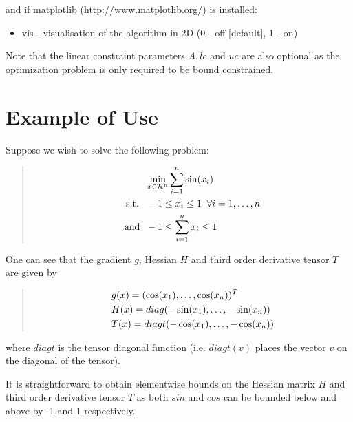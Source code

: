 \documentclass[letterpaper,11pt,openany,oneside]{sphinxmanual}
\begin{document}
and if matplotlib (\href{http://www.matplotlib.org/}{http://www.matplotlib.org/}) is installed:
\begin{itemize}
\item {} 
vis - visualisation of the algorithm in 2D (0 - off {[}default{]}, 1 - on)

\end{itemize}

Note that the linear constraint parameters $A, lc$ and  $uc$ are also optional as the optimization problem is only required to be bound constrained.


\section{Example of Use}
\label{userguide:example-of-use}
Suppose we wish to solve the following problem:
\begin{quote}
\begin{gather}
\begin{split}&\min_{x \in \mathcal{R}^n} \sum_{i=1}^n \sin(x_i) \\
\text{s.t. } \; &-1 \le x_i \le 1 \; \; \forall i=1,\dotsc,n \\
\text{and }  \; &-1 \le \sum_{i=1}^nx_i \le 1\end{split}\notag
\end{gather}\end{quote}

One can see that the gradient $g$, Hessian $H$ and third order derivative tensor $T$ are given by
\begin{quote}
\begin{gather}
\begin{split}&g(x) = ( \cos(x_1), \dotsc, \cos(x_n))^T \\
&H(x) = diag( -\sin(x_1), \dotsc, -\sin(x_n)) \\
&T(x) = diagt( -\cos(x_1), \dotsc, -\cos(x_n))\end{split}\notag
\end{gather}\end{quote}

where $diagt$ is the tensor diagonal function (i.e. $diagt(v)$ places the vector $v$ on the diagonal of the tensor).

It is straightforward to obtain elementwise bounds on the Hessian matrix $H$ and third order derivative tensor $T$ as both $sin$ and $cos$ can be bounded below and above by -1 and 1 respectively.
\end{document}
